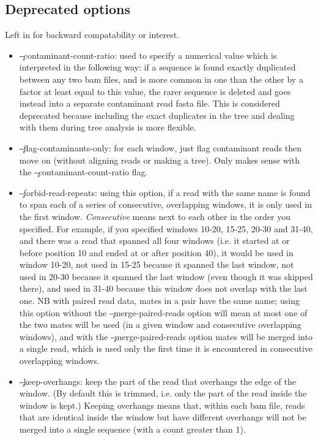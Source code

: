 \subsection{Deprecated options}
Left in \p for backward compatability or interest.
\begin{itemize}
\item \c{--contaminant-count-ratio}: used to specify a numerical value which is interpreted in the following way: if a sequence is found exactly duplicated between any two bam files, and is more common in one than the other by a factor at least equal to this value, the rarer sequence is deleted and goes instead into a separate contaminant read fasta file.
This is considered deprecated because including the exact duplicates in the tree and dealing with them during tree analysis is more flexible.
\item \c{--flag-contaminants-only}: for each window, just flag contaminant reads then move on (without aligning reads or making a tree).
Only makes sense with the \c{--contaminant-count-ratio} flag.
\item \c{--forbid-read-repeats}: using this option, if a read with the same name is found to span each of a series of consecutive, overlapping windows, it is only used in the first window.
{\it Consecutive} means next to each other in the order you specified.
For example, if you specified windows 10-20, 15-25, 20-30 and 31-40, and there was a read that spanned all four windows (i.e. it started at or before position 10 and ended at or after position 40), it would be used in window 10-20, not used in 15-25 because it spanned the last window, not used in 20-30 because it spanned the last window (even though it was skipped there), and used in 31-40 because this window does not overlap with the last one.
NB with paired read data, mates in a pair have the same name; using this option without the \c{--merge-paired-reads} option will mean at most one of the two mates will be used (in a given window and consecutive overlapping windows), and with the \c{--merge-paired-reads} option mates will be merged into a single read, which is used only the first time it is encountered in consecutive overlapping windows.
\item \c{--keep-overhangs}: keep the part of the read that overhangs the edge of the window.
(By default this is trimmed, i.e. only the part of the read inside the window is kept.)
Keeping overhangs means that, within each bam file, reads that are identical inside the window but have different overhangs will not be merged into a single sequence (with a count greater than 1).

\end{itemize}
